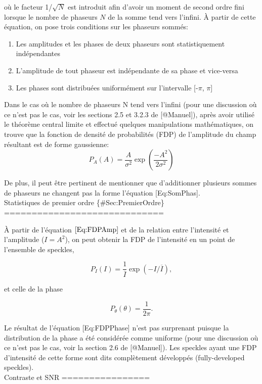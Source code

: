 \documentclass[]{article}
\begin{document}
où le facteur 1/\(\sqrt{N}\) est introduit afin d'avoir un moment de
second ordre fini lorsque le nombre de phaseurs \(N\) de la somme tend
vers l'infini. À partir de cette équation, on pose trois conditions sur
les phaseurs sommés:

\begin{enumerate}
\def\labelenumi{\arabic{enumi}.}
\item
  Les amplitudes et les phases de deux phaseurs sont statistiquement
  indépendantes
\item
  L'amplitude de tout phaseur est indépendante de sa phase et vice-versa
\item
  Les phases sont distribuées uniformément sur l'intervalle {[}-\(\pi\),
  \(\pi\){]}
\end{enumerate}

Dans le cas où le nombre de phaseurs N tend vers l'infini (pour une
discussion où ce n'est pas le cas, voir les sections 2.5 et 3.2.3 de
{[}@Manuel{]}), après avoir utilisé le théorème central limite et
effectué quelques manipulations mathématiques, on trouve que la fonction
de densité de probabilités (FDP) de l'amplitude du champ résultant est
de forme gaussienne: \[
\label{Eq:FDPAmp}
P_{A}(A) = \frac{A}{\sigma^2}\exp\left(\frac{-A^2}{2\sigma^2}\right)
\]

De plus, il peut être pertinent de mentionner que d'additionner
plusieurs sommes de phaseurs ne changent pas la forme l'équation
{[}Eq:SomPhas{]}.\\
Statistiques de premier ordre \{\#Sec:PremierOrdre\}
=============================

À partir de l'équation \(\ref{Eq:FDPAmp}\) et de la relation entre
l'intensité et l'amplitude (\(I=A^2\)), on peut obtenir la FDP de
l'intensité en un point de l'ensemble de speckles,

\[
\label{Eq:FDPInt}
    P_{I}(I) = \frac{1}{\overline{I}}\exp(-I/\overline{I}),
\]

et celle de la phase

\[
\label{Eq:FDPPhase}
    P_{\theta}(\theta) = \frac{1}{2\pi}.
\]

Le résultat de l'équation {[}Eq:FDPPhase{]} n'est pas surprenant puisque
la distribution de la phase a été considérée comme uniforme (pour une
discussion où ce n'est pas le cas, voir la section 2.6 de
{[}@Manuel{]}). Les speckles ayant une FDP d'intensité de cette forme
sont dits complètement développés (fully-developed speckles).\\
Contraste et SNR ================
\end{document}
